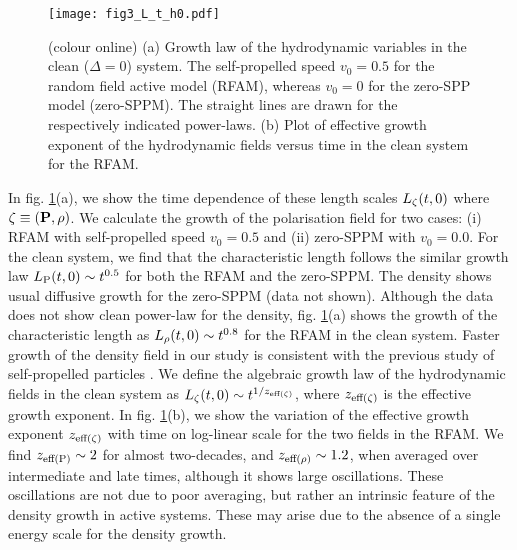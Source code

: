 \documentclass[pre,twocolumn,amssymb,showpacs,superscriptaddress,notitlepage]{revtex4-1}
\begin{document}
\begin{figure}[b]
  \begin{center}
  \texttt{[image: fig3\_L\_t\_h0.pdf]}
\caption{(colour online) 
(a) Growth law of the hydrodynamic variables in the clean ($\Delta=0$) system. The self-propelled speed $v_0=0.5$ for the random field
active model (RFAM), whereas $v_0=0$ for the  zero-SPP model (zero-SPPM). The straight lines are drawn for the respectively 
indicated power-laws.
(b) Plot of effective growth exponent of the hydrodynamic fields versus time in the clean system for the RFAM.}
\label{fig3}
\end{center}
\end{figure}


In fig. \ref{fig3}(a), we show the time dependence of these length scales $L_{\rm \zeta}(t,0)$ where $\zeta \equiv ({\bf  P}, \rho)$.
We calculate the growth of the  polarisation
 field for two cases: (i) RFAM  with self-propelled speed $v_0=0.5$ and (ii)  zero-SPPM with $v_0=0.0$. 
For the clean system, we find that the characteristic length follows the similar growth law $L_{\rm  P}(t,0)\sim t^{0.5}$ 
for both the RFAM and the zero-SPPM.
The density shows usual diffusive growth for the zero-SPPM (data not shown).  
Although the data does not show clean power-law for the density, fig. \ref{fig3}(a) shows the  growth of the
characteristic length as $L_{\rm \rho}(t,0) \sim t^{0.8}$ for the RFAM in the clean system. 
Faster  growth of the density field in our study  is consistent with the previous study of self-propelled 
particles \cite{chatepre}. 
We define the algebraic growth law of the hydrodynamic fields in the clean system as $L_{\rm \zeta}(t,0) \sim t^{1/z_{\rm eff (\rm \zeta)}}$, 
where $z_{\rm eff (\rm \zeta)}$ is the effective growth exponent. 
In fig. \ref{fig3}(b), we show the variation of the effective growth exponent $z_{\rm eff (\zeta)}$ with time on log-linear scale 
for the two fields in the RFAM.
We find $z_{\rm eff (P)} \sim 2$ for almost two-decades, and $z_{\rm eff (\rho)} \sim 1.2$, 
when averaged over intermediate and late times, although it shows large oscillations.  These oscillations are not due to poor averaging, but rather an intrinsic feature of the density growth in active systems. These may arise due to the absence of a single energy scale for the density growth. 
\end{document}
